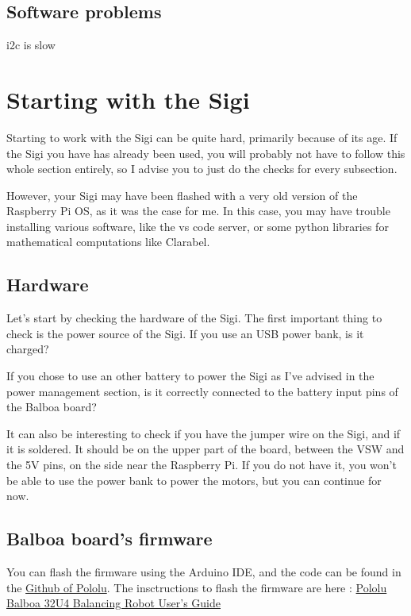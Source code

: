 \documentclass{article}
\begin{document}
\subsection{Software problems}

i2c is slow


\section{Starting with the Sigi}

Starting to work with the Sigi can be quite hard, primarily because of its age.
If the Sigi you have has already been used, you will probably not have to follow this whole
section entirely, so I advise you to just do the checks for every subsection.

However, your Sigi may have been flashed with a very old version of the Raspberry Pi OS, as it was
the case for me. In this case, you may have trouble installing various software, like the vs code
server, or some python libraries for mathematical computations like Clarabel.

\subsection{Hardware}

Let's start by checking the hardware of the Sigi.
The first important thing to check is the power source of the Sigi.
If you use an USB power bank, is it charged?

If you chose to use an other battery to power the Sigi as I've advised in the power management
section, is it correctly connected to the battery input pins of the Balboa board?

It can also be interesting to check if you have the jumper wire on the Sigi, and if it is soldered.
It should be on the upper part of the board, between the VSW and the 5V pins, on the side near the
Raspberry Pi. If you do not have it, you won't be able to use the power bank to power the motors,
but you can continue for now.

\subsection{Balboa board's firmware}

You can flash the firmware using the Arduino IDE, and the code can be found in the
\href{https://github.com/pololu/pololu-rpi-slave-arduino-library/blob/master/examples/
AStarRPiSlaveDemo/AStarRPiSlaveDemo.ino}{Github of Pololu}.
The insctructions to flash the firmware are here : \href{https://www.pololu.com/
docs/pdf/0J70/balboa_32u4_robot.pdf}{Pololu Balboa 32U4 Balancing Robot User's Guide}
\end{document}
